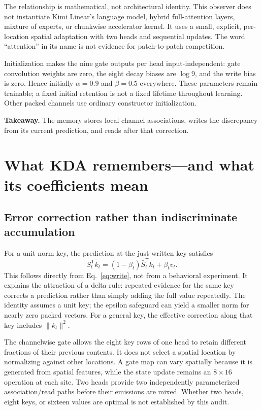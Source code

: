 \documentclass[10pt,letterpaper]{article}
\newcommand{\takeaway}[1]{\par\smallskip\noindent\textbf{Takeaway.} #1}
\newcommand{\psection}[1]{\clearpage\section{#1}}
\begin{document}
The relationship is mathematical, not architectural identity. This observer does not instantiate Kimi Linear's language model, hybrid full-attention layers, mixture of experts, or chunkwise accelerator kernel. It uses a small, explicit, per-location spatial adaptation with two heads and sequential updates. The word ``attention'' in its name is not evidence for patch-to-patch competition.

Initialization makes the nine gate outputs per head input-independent: gate convolution weights are zero, the eight decay biases are $\log9$, and the write bias is zero. Hence initially $\alpha=0.9$ and $\beta=0.5$ everywhere. These parameters remain trainable; a fixed initial retention is not a fixed lifetime throughout learning. Other packed channels use ordinary constructor initialization.
\takeaway{The memory stores local channel associations, writes the discrepancy from its current prediction, and reads after that correction.}

\psection{What KDA remembers---and what its coefficients mean}
\subsection{Error correction rather than indiscriminate accumulation}
For a unit-norm key, the prediction at the just-written key satisfies
\begin{equation}
S_t^{\mathsf T}k_t=(1-\beta_t)\bar S_t^{\mathsf T}k_t+\beta_tv_t .\label{eq:interpolation}
\end{equation}
This follows directly from Eq.~\eqref{eq:write}, not from a behavioral experiment. It explains the attraction of a delta rule: repeated evidence for the same key corrects a prediction rather than simply adding the full value repeatedly. The identity assumes a unit key; the epsilon safeguard can yield a smaller norm for nearly zero packed vectors. For a general key, the effective correction along that key includes $\lVert k_t\rVert^2$.

The channelwise gate allows the eight key rows of one head to retain different fractions of their previous contents. It does not select a spatial location by normalizing against other locations. A gate map can vary spatially because it is generated from spatial features, while the state update remains an $8\times16$ operation at each site. Two heads provide two independently parameterized association/read paths before their emissions are mixed. Whether two heads, eight keys, or sixteen values are optimal is not established by this audit.
\end{document}
